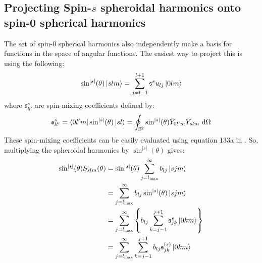 \documentclass[preprint,showpacs,preprintnumbers,amssymb,superscriptaddress,aps,prd,nofootinbib,11pt]{revtex4-1}
\begin{document}
\subsection{Projecting Spin-$s$ spheroidal harmonics onto spin-0 spherical harmonics}
The set of spin-0 spherical harmonics also independently make a basis for functions in the space of angular functions. The easiest way to project this is using the following:
\begin{equation}
    \sin^{|s|}(\theta) \ket{s l m} = \sum\limits_{j=l-1}^{l+1} \mathfrak{s}^su_{lj} \ket{0 l m}
\end{equation}
where $\mathfrak{s}^s_{ll'}$ are spin-mixing coefficients defined by:
\begin{equation}
    \mathfrak{s}^s_{ll'} = \bra{0 l' m} \sin^{|s|}(\theta) \ket{s l} = \oint_{\mathbb{S}^2} \sin^{|s|}(\theta) \bar{Y}_{0l'm} Y_{slm} \ \dd \Omega
\end{equation}
These spin-mixing coefficients can be easily evaluated using equation 133a in \cite{dolan2023metric}. So, multiplying the spheroidal harmonics by $\sin^{|s|}(\theta)$ gives:
\begin{align}
    \sin^{|s|}(\theta) S_{slm}(\theta) &= \sin^{|s|}(\theta) \sum\limits_{j = l_\text{max}}^\infty b_{lj}\ket{s j m}\\
    &= \sum\limits_{j = l_\text{max}}^\infty b_{lj} \sin^{|s|}(\theta)\ket{s j m}\\
    &= \sum\limits_{j = l_\text{max}}^\infty \left\{b_{lj}\sum\limits_{k=j-1}^{j+1} \mathfrak{s}^s_{jk} \ket{0 k m} \right\}\\
    &=\sum\limits_{j = l_\text{max}}^\infty \sum\limits_{k=j-1}^{j+1}  b_{lj} \mathfrak{s}^{(s)}_{jk} \ket{0km}
\end{align}


\end{document}
